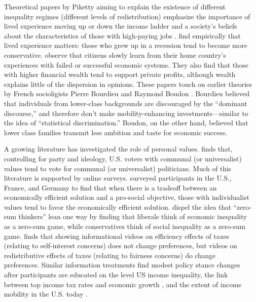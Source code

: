 \documentclass[11pt, headsepline]{article}
\begin{document}
Theoretical papers by Piketty aiming to explain the existence of different inequality regimes (different levels of redistribution) emphasize the importance of lived experience moving up or down the income ladder \citep{piketty1995social} and a society's beliefs about the characteristics of those with high-paying jobs \citep{piketty1998self}. %
\cite{giuliano2024aggregate} find empirically that lived experience matters: those who grew up in a recession tend to become more conservative. \cite{landier2008investigating} observe that citizens slowly learn from their home country's experiences with failed or successful economic systems. They also find that those with higher financial wealth tend to support private profits, although wealth explains little of the dispersion in opinions. These papers touch on earlier theories by French socioligists Pierre Bourdieu and Raymond Boudon \citep{piketty2000theories}. Bourdieu believed that individuals from lower-class backgrounds are discouraged by the “dominant discourse,” and therefore don’t make mobility-enhancing investments---similar to the idea of ``statistical discrimination.'' Boudon, on the other hand, believed that lower class families transmit less ambition and taste for economic success.

A growing literature has investigated the role of personal values. \cite{enke2020moral} finds that, controlling for party and ideology, U.S. voters with communal (or universalist) values tend to vote for communal (or universalist) politicians. Much of this literature is supported by online surveys. \cite{landier2022neoliberal} surveyed participants in the U.S., France, and Germany to find that when there is a tradeoff between an economically efficient solution and a pro-social objective, those with individualist values tend to favor the economically efficient solution. \cite{davidai2019politics} dispel the idea that ``zero-sum thinkers'' lean one way by finding that liberals think of economic inequality as a zero-sum game, while conservatives think of social inequality as a zero-sum game. \cite{stantcheva2021understanding} finds that showing informational videos on efficiency effects of taxes (relating to self-interest concerns) does not change preferences, but videos on redistributive effects of taxes (relating to fairness concerns) do change preferences. Similar information treatments find modest policy stance changes after participants are educated on the level US income inequality, the link between top income tax rates and economic growth \citep{kuziemko2015elastic}, and the extent of income mobility in the U.S. today \citep{alesina2018intergenerational}.
\end{document}
